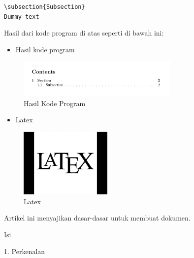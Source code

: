 \begin{itemize}
\begin{verbatim}
\subsection{Subsection}
Dummy text

\end{verbatim}

Hasil dari kode program di atas seperti di bawah ini: \par

\begin{itemize}
	\item Hasil kode program
\end{itemize}
\begin{figure}[ht]
	\centerline{\includegraphics[width=0.70\textwidth]{gambar/Conten}}
	\caption{Hasil Kode Program}
	\label{Hasil Kode Program}
\end{figure}

\vspace{\baselineskip}

\begin{itemize}
	\item Latex
\end{itemize}
\begin{figure}[ht]
	\centerline{\includegraphics[width=0.40\textwidth]{gambar/Latex}}
	\caption{Latex}
	\label{Latex}
\end{figure}

 \par
\vspace{\baselineskip}
Artikel ini menyajikan dasar-dasar untuk membuat dokumen.\par

\hspace*{0.5in}Isi\par

\hspace*{0.5in}1. Perkenalan\par


\end{itemize}
